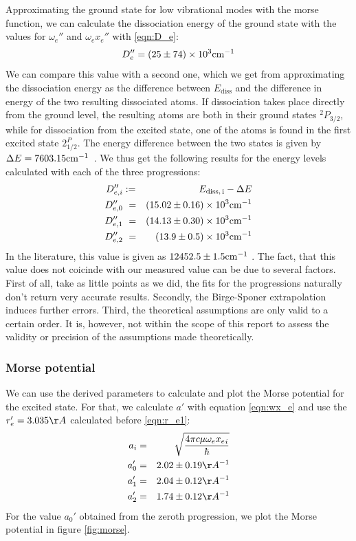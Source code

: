 Approximating the ground state for low vibrational modes with the morse function, 
we can calculate the dissociation energy of the ground state with the values for 
$\omega_e''$ and $\omega_e x_e''$ with \eqref{eqn:D_e}:
\begin{equation}
    D_e'' =\left(25 \pm 74\right) \times 10^{3} \mathrm{cm^{-1}}
\end{equation}
We can compare this value with a second one, which we get from approximating the 
dissociation energy as the difference between $E_\mathrm{diss}$ and the difference in 
energy of the two resulting dissociated atoms. If dissociation takes place directly 
from the ground level, the resulting atoms are both in their ground states $^2 P_{3/2}$, 
while for dissociation from the excited state, one of the atoms is found in the first 
excited state $2^ P_{1/2}$. The energy difference between the two states is given by 
$\Delta E = 7603.15 \mathrm{cm^{-1}}$~\cite{nist}. We thus get the following results for the energy 
levels calculated with each of the three progressions:
\begin{eqnarray}
    D_{e, i}'' &:=& E_\mathrm{diss,\, i} - \Delta E\\
    D_{e, 0}'' &\ =&\left(15.02 \pm 0.16\right) \times 10^{3} \mathrm{cm^{-1}} \\
    D_{e, 1}'' &\ =&\left(14.13 \pm 0.30\right) \times 10^{3} \mathrm{cm^{-1}} \\
    D_{e, 2}'' &\ =&\left(13.9 \pm 0.5\right) \times 10^{3} \mathrm{cm^{-1}}
\end{eqnarray}
In the literature, this value is given as $12452.5 \pm 1.5 \mathrm{cm^{-1}}$ \cite{leroy1970spectroscopic}. 
The fact, that this value 
does not coicinde with our measured value can be due to several factors. 
First of all, take as little points as we did, the fits for the progressions 
naturally don't return very accurate results. Secondly, the Birge-Sponer extrapolation 
induces further errors. Third, the theoretical assumptions are only valid to a certain order. 
It is, however,  not within the scope of this report to assess the validity or precision of 
the assumptions made theoretically.

\subsubsection{Morse potential}
We can use the derived parameters to calculate and plot the Morse potential for the 
excited state. For that, we calculate $a'$ with equation \eqref{eqn:wx_e} and 
use the $r_e' = 3.035 \AA$ calculated before \eqref{eqn:r_e1}:
\begin{eqnarray}
    a_i &=& \sqrt{\frac{4 \pi c \mu {\omega_e x_e}_i}{\hbar}} \\
    a_0' &=& 2.02 \pm 0.19 \AA^{-1} \\
    a_1' &=& 2.04 \pm 0.12 \AA^{-1} \\
    a_2' &=& 1.74 \pm 0.12 \AA^{-1} \\
\end{eqnarray}
For the value $a_0'$ obtained from the zeroth progression, we plot the Morse potential 
in figure \ref{fig:morse}.

